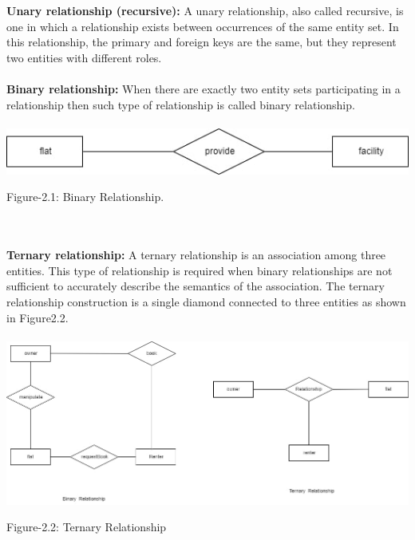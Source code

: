  \\
 \\
 \newpage
 \noindent
 \textbf{Unary relationship (recursive):}
A unary relationship, also called recursive, is one in which a relationship exists between occurrences of the same entity set. In this relationship, the primary and foreign keys are the same, but they represent two entities with different roles.
 \\
 \\
 \textbf{Binary relationship:}
 When there are exactly two  entity sets participating in a relationship then such type of relationship is called binary relationship.\\
 \\
 \includegraphics[width=1\textwidth,inner]{images/Binary relationship.drawio.jpg} 
 \begin{center}
    Figure-2.1: Binary Relationship.
 \end{center}
  
 \\
 \\
 \noindent
 \textbf{Ternary relationship:}
A ternary relationship is an association among three entities. This type of relationship is required when binary relationships are not sufficient to accurately describe the semantics of the association. The ternary relationship construction is a single diamond connected to three entities as shown in Figure2.2.\\
 \\
 \includegraphics[width=1\textwidth,inner]{images/Untitled Diagram.drawio.jpg}
 \begin{center}
     Figure-2.2: Ternary Relationship 
 \end{center}
 
 
  